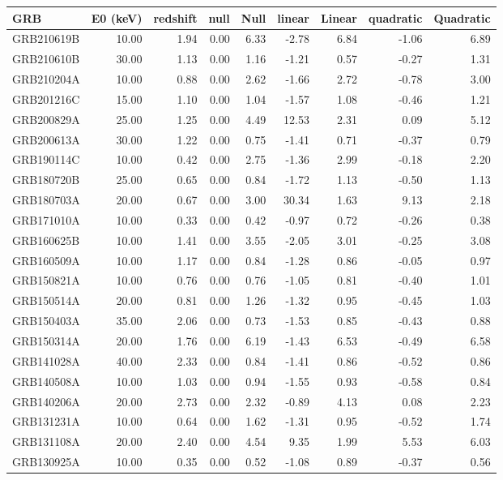 \begin{tabular}{lrrrrrrrr}
\toprule
GRB & E0 (keV) & redshift & null & Null & linear & Linear & quadratic & Quadratic \\
\midrule
GRB210619B & 10.00 & 1.94 & 0.00 & 6.33 & -2.78 & 6.84 & -1.06 & 6.89 \\
GRB210610B & 30.00 & 1.13 & 0.00 & 1.16 & -1.21 & 0.57 & -0.27 & 1.31 \\
GRB210204A & 10.00 & 0.88 & 0.00 & 2.62 & -1.66 & 2.72 & -0.78 & 3.00 \\
GRB201216C & 15.00 & 1.10 & 0.00 & 1.04 & -1.57 & 1.08 & -0.46 & 1.21 \\
GRB200829A & 25.00 & 1.25 & 0.00 & 4.49 & 12.53 & 2.31 & 0.09 & 5.12 \\
GRB200613A & 30.00 & 1.22 & 0.00 & 0.75 & -1.41 & 0.71 & -0.37 & 0.79 \\
GRB190114C & 10.00 & 0.42 & 0.00 & 2.75 & -1.36 & 2.99 & -0.18 & 2.20 \\
GRB180720B & 25.00 & 0.65 & 0.00 & 0.84 & -1.72 & 1.13 & -0.50 & 1.13 \\
GRB180703A & 20.00 & 0.67 & 0.00 & 3.00 & 30.34 & 1.63 & 9.13 & 2.18 \\
GRB171010A & 10.00 & 0.33 & 0.00 & 0.42 & -0.97 & 0.72 & -0.26 & 0.38 \\
GRB160625B & 10.00 & 1.41 & 0.00 & 3.55 & -2.05 & 3.01 & -0.25 & 3.08 \\
GRB160509A & 10.00 & 1.17 & 0.00 & 0.84 & -1.28 & 0.86 & -0.05 & 0.97 \\
GRB150821A & 10.00 & 0.76 & 0.00 & 0.76 & -1.05 & 0.81 & -0.40 & 1.01 \\
GRB150514A & 20.00 & 0.81 & 0.00 & 1.26 & -1.32 & 0.95 & -0.45 & 1.03 \\
GRB150403A & 35.00 & 2.06 & 0.00 & 0.73 & -1.53 & 0.85 & -0.43 & 0.88 \\
GRB150314A & 20.00 & 1.76 & 0.00 & 6.19 & -1.43 & 6.53 & -0.49 & 6.58 \\
GRB141028A & 40.00 & 2.33 & 0.00 & 0.84 & -1.41 & 0.86 & -0.52 & 0.86 \\
GRB140508A & 10.00 & 1.03 & 0.00 & 0.94 & -1.55 & 0.93 & -0.58 & 0.84 \\
GRB140206A & 20.00 & 2.73 & 0.00 & 2.32 & -0.89 & 4.13 & 0.08 & 2.23 \\
GRB131231A & 10.00 & 0.64 & 0.00 & 1.62 & -1.31 & 0.95 & -0.52 & 1.74 \\
GRB131108A & 20.00 & 2.40 & 0.00 & 4.54 & 9.35 & 1.99 & 5.53 & 6.03 \\
GRB130925A & 10.00 & 0.35 & 0.00 & 0.52 & -1.08 & 0.89 & -0.37 & 0.56 \\

\end{tabular}

